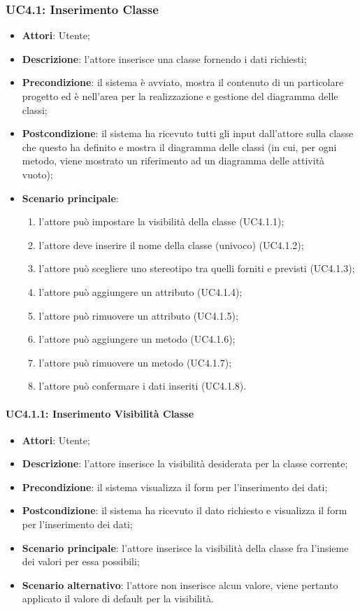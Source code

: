 \subsubsection{UC4.1: Inserimento Classe}
\label{UC4.1}
\begin{itemize}
	\item \textbf{Attori}: Utente;
	\item \textbf{Descrizione}: l'attore inserisce una classe fornendo i dati richiesti;
	\item \textbf{Precondizione}: il sistema è avviato, mostra il contenuto di un particolare progetto ed è nell'area per la realizzazione e gestione del diagramma delle classi;
	\item \textbf{Postcondizione}: il sistema ha ricevuto tutti gli input dall'attore sulla classe che questo ha definito e mostra il diagramma delle classi (in cui, per ogni metodo, viene mostrato un riferimento ad un diagramma delle attività vuoto);
	\item \textbf{Scenario principale}:
	\begin{enumerate}
		\item l'attore può impostare la visibilità della classe (UC4.1.1);
		\item l'attore deve inserire il nome della classe (univoco) (UC4.1.2);
		\item l'attore può scegliere uno stereotipo tra quelli forniti e previsti (UC4.1.3);
		\item l'attore può aggiungere un attributo (UC4.1.4);
		\item l'attore può rimuovere un attributo (UC4.1.5);
		\item l'attore può aggiungere un metodo (UC4.1.6);
		\item l'attore può rimuovere un metodo (UC4.1.7);

		\item l'attore può confermare i dati inseriti (UC4.1.8).
	\end{enumerate}
\end{itemize}

\paragraph{UC4.1.1: Inserimento Visibilità Classe}
\label{UC4.1.1}
\begin{itemize}
	\item \textbf{Attori}: Utente;
	\item \textbf{Descrizione}: l'attore inserisce la visibilità desiderata per la classe corrente;
	\item \textbf{Precondizione}: il sistema visualizza il form per l'inserimento dei dati;
	\item \textbf{Postcondizione}: il sistema ha ricevuto il dato richiesto e visualizza il form per l'inserimento dei dati;
	\item \textbf{Scenario principale}: l'attore inserisce la visibilità della classe fra l'insieme dei valori per essa possibili;
	\item \textbf{Scenario alternativo}: l'attore non inserisce alcun valore, viene pertanto applicato il valore di default per la visibilità.
\end{itemize}

